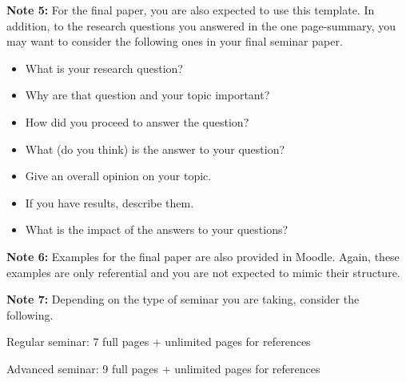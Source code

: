 \documentclass[sigconf]{acmart}
\begin{document}
\textbf{Note 5:} For the final paper, you are also expected to use this template. In addition, to the research questions you answered in the one page-summary, you may want to consider the following ones in your final seminar paper.
  \begin{itemize}
  \item What is your research question?
  \item Why are that question and your topic important?
  \item How did you proceed to answer the question?
  \item What (do you think) is the answer to your question?
  \item Give an overall opinion on your topic.
  \item If you have results, describe them.
  \item What is the impact of the answers to your questions?
  \end{itemize}
  
\textbf{Note 6:} Examples for the final paper are also provided in Moodle. Again, these examples are only referential and you are not expected to mimic their structure. 

\textbf{Note 7:} Depending on the type of seminar you are taking, consider the following.

Regular seminar: 7 full pages + unlimited pages for references 

Advanced seminar: 9 full pages + unlimited pages for references 

\newpage

 
\end{document}
